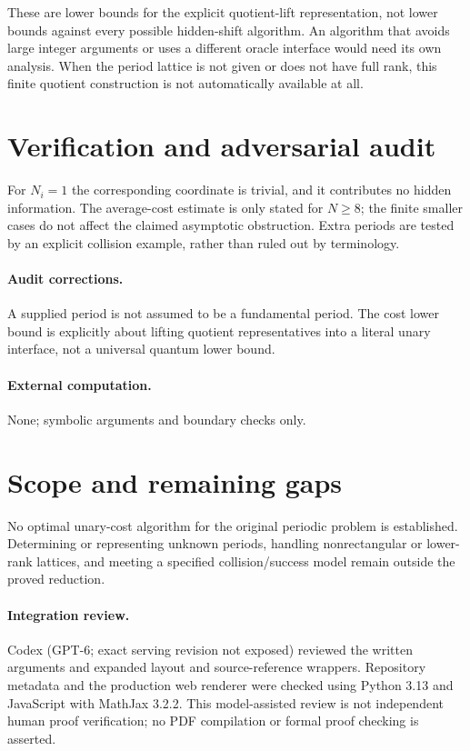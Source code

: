 \documentclass[11pt]{article}
\begin{document}
These are lower bounds for the explicit quotient-lift representation, not lower bounds against every possible hidden-shift algorithm. An algorithm that avoids large integer arguments or uses a different oracle interface would need its own analysis. When the period lattice is not given or does not have full rank, this finite quotient construction is not automatically available at all.
\section{Verification and adversarial audit}
For $N_i=1$ the corresponding coordinate is trivial, and it contributes no hidden information. The average-cost estimate is only stated for $N\geq8$; the finite smaller cases do not affect the claimed asymptotic obstruction. Extra periods are tested by an explicit collision example, rather than ruled out by terminology.
\paragraph{Audit corrections.} A supplied period is not assumed to be a fundamental period. The cost lower bound is explicitly about lifting quotient representatives into a literal unary interface, not a universal quantum lower bound.
\paragraph{External computation.} None; symbolic arguments and boundary checks only.
\section{Scope and remaining gaps}
No optimal unary-cost algorithm for the original periodic problem is established. Determining or representing unknown periods, handling nonrectangular or lower-rank lattices, and meeting a specified collision/success model remain outside the proved reduction.
\paragraph{Integration review.} Codex (GPT-6; exact serving revision not exposed) reviewed the written arguments and expanded layout and source-reference wrappers. Repository metadata and the production web renderer were checked using Python 3.13 and JavaScript with MathJax 3.2.2. This model-assisted review is not independent human proof verification; no PDF compilation or formal proof checking is asserted.
\end{document}

